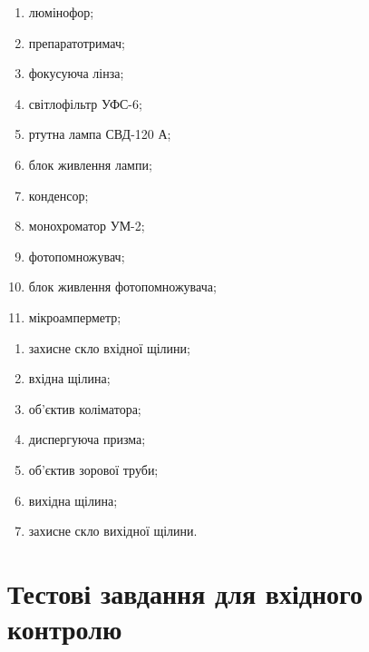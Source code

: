 \documentclass[twocolumn]{el-author}
\begin{document}
\newpage
\begin{enumerate}
	\item люмінофор;
	\item препаратотримач;
	\item фокусуюча лінза;
	\item світлофільтр УФС-6;
	\item ртутна лампа СВД-120 А;
	\item блок живлення лампи;
	\item конденсор;
	\item монохроматор УМ-2;
	\item фотопомножувач;
	\item блок живлення фотопомножувача;
	\item мікроамперметр;
\end{enumerate}

\bigskip
\bigskip
\bigskip
\bigskip
\bigskip
\bigskip
\bigskip

\begin{enumerate}
	\item захисне скло вхідної щілини;
	\item вхідна щілина;
	\item об'єктив коліматора;
	\item диспергуюча призма;
	\item об'єктив зорової труби;
	\item вихідна щілина;
	\item захисне скло вихідної щілини.
\end{enumerate}


\clearpage
\section{Тестові завдання для вхідного контролю}
\end{document}
